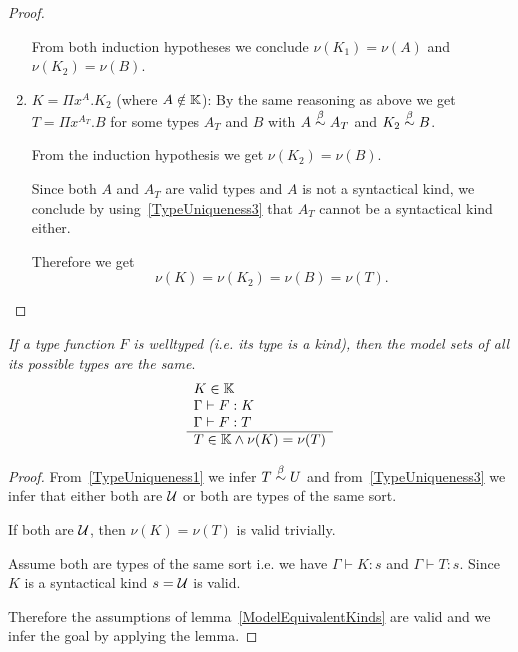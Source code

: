 \begin{lemma}
\begin{proof}
\begin{enumerate}
            From both induction hypotheses we conclude $\nu(K_1) = \nu(A)$ and
            $\nu(K_2) = \nu(B)$.


        \item $K = \Pi x^A . K_2$ (where $A \notin \mathbb{K}$):
            By the same reasoning as above we get $T = \Pi x^{A_T}.B$ for some
            types $A_T$ and $B$ with $A \stackrel{\beta}{\sim} A_T$ and $ K_2 \stackrel{\beta}{\sim} B$.

                From the induction hypothesis we get $\nu(K_2) = \nu(B)$.

            Since both $A$ and $A_T$ are valid types and $A$ is not a
                syntactical kind, we conclude by using~\ref{TypeUniqueness3}
                that $A_T$ cannot be a syntactical kind either.

            Therefore we get
            $$
                \nu(K) = \nu(K_2) = \nu(B) = \nu(T).
            $$
        \end{enumerate}
    \end{proof}
\end{lemma}


\begin{theorem}
    \label{ModelAllTypesSame}
    \emph{If a type function $F$ is welltyped (i.e. its type is a kind), then
    the model sets of all its possible types are the same}.
    $$
    \begin{array}{l} 
        K \in \mathbb{K}
        \\
        \Gamma \vdash F: K
        \\
        \Gamma \vdash F: T
     \\ \hline 
        T \in \mathbb{K} \land \nu(K) = \nu(T)
    \end{array}
    $$

    \begin{proof}
        From~\ref{TypeUniqueness1} we infer $T \stackrel{\beta}{\sim} U$ and
        from~\ref{TypeUniqueness3} we infer that either both are ${\cal U}$ or both
        are types of the same sort.

        If both are ${\cal U}$, then $\nu(K) = \nu(T)$ is valid trivially.

        Assume both are types of the same sort i.e. we have $\Gamma \vdash K: s$
        and $\Gamma \vdash T: s$. Since $K$ is a syntactical kind $s = {\cal U}$ is
        valid.

        Therefore the assumptions of lemma~\ref{ModelEquivalentKinds} are valid
        and we infer the goal by applying the lemma.
    \end{proof}
\end{theorem}



